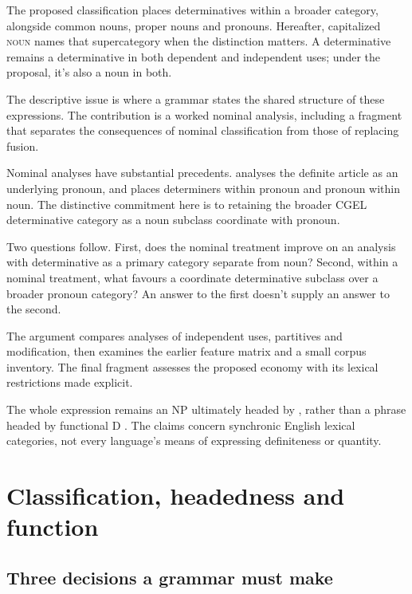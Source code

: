 \documentclass[12pt]{article}
\begin{document}
The proposed classification places determinatives within a broader  category, alongside common nouns, proper nouns and pronouns. Hereafter, capitalized \textsc{noun} names that supercategory when the distinction matters. A determinative remains a determinative in both dependent and independent uses; under the proposal, it's also a noun in both.

The descriptive issue is where a grammar states the shared structure of these expressions. The contribution is a worked nominal analysis, including a fragment that separates the consequences of nominal classification from those of replacing fusion.

Nominal analyses have substantial precedents. \textcite{sommerstein1972} analyses the definite article as an underlying pronoun, and \textcite{hudson2004determiners,hudson2010wordgrammar} places determiners within pronoun and pronoun within noun. The distinctive commitment here is to retaining the broader CGEL determinative category as a noun subclass coordinate with pronoun.

Two questions follow. First, does the nominal treatment improve on an analysis with determinative as a primary category separate from noun? Second, within a nominal treatment, what favours a coordinate determinative subclass over a broader pronoun category? An answer to the first doesn't supply an answer to the second.

The argument compares analyses of independent uses, partitives and modification, then examines the earlier feature matrix and a small corpus inventory. The final fragment assesses the proposed economy with its lexical restrictions made explicit.

The whole expression  remains an NP ultimately headed by , rather than a phrase headed by functional D \citep{abney1987}. The claims concern synchronic English lexical categories, not every language's means of expressing definiteness or quantity.

\section{Classification, headedness and function}\label{sec:alternatives}

\subsection{Three decisions a grammar must make}
\end{document}
